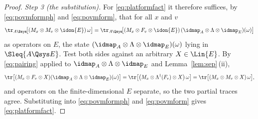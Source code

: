 \begin{proof}
\emph{Step 3 (the substitution).} For \eqref{eq:platformfact} it therefore
suffices, by \eqref{eq:povmformph} and \eqref{eq:povmform}, that for all $x$
and $v$
\begin{equation}\label{eq:jointtransport}
  \tr_{A\Bsys}\!\big[(M_x\otimes M_v\otimes\idon{E})\,\omega\big]
  =\tr_{A\Qsys}\!\big[(M_x\otimes F_v\otimes\idon{E})\,
    (\idmap_A\otimes\Lambda\otimes\idmap_E)(\omega)\big]
\end{equation}
as operators on $E$, the state $(\idmap_A\otimes\Lambda\otimes\idmap_E)(\omega)$
lying in $\Sleq{A\Qsys E}$. Test both sides against an arbitrary
$X\in\Lin{E}$. By \eqref{eq:pairing} applied to
$\idmap_A\otimes\Lambda\otimes\idmap_E$ and Lemma~\ref{lem:sep}\,(ii),
\begin{equation*}
  \tr\big[(M_x\otimes F_v\otimes X)(\idmap_A\otimes\Lambda\otimes\idmap_E)(\omega)\big]
  =\tr\big[\big(M_x\otimes\Lambda^{\dagger}(F_v)\otimes X\big)\,\omega\big]
  =\tr\big[(M_x\otimes M_v\otimes X)\,\omega\big],
\end{equation*}
and operators on the finite-dimensional $E$ separate, so the two partial traces
agree. Substituting into \eqref{eq:povmformph} and \eqref{eq:povmform} gives
\eqref{eq:platformfact}.
\end{proof}
